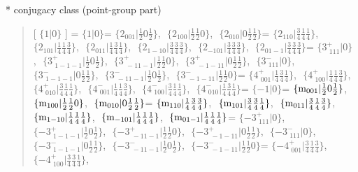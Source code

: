 \documentclass[fleqn,10pt,landscape]{jsarticle}
\begin{document}
* conjugacy class (point-group part)
\begin{quote}
[ $\{1|0\}$ ] = \quad $\{1|0\}$ = \quad $\{2{}_{001}|\frac{1}{2} 0 \frac{1}{2}\}$,\,\, $\{2{}_{100}|\frac{1}{2} \frac{1}{2} 0\}$,\,\, $\{2{}_{010}|0 \frac{1}{2} \frac{1}{2}\}$ = \quad $\{2{}_{110}|\frac{3}{4} \frac{1}{4} \frac{1}{4}\}$,\,\, $\{2{}_{101}|\frac{1}{4} \frac{1}{4} \frac{3}{4}\}$,\,\, $\{2{}_{011}|\frac{1}{4} \frac{3}{4} \frac{1}{4}\}$,\,\, $\{2{}_{1-10}|\frac{3}{4} \frac{3}{4} \frac{3}{4}\}$,\,\, $\{2{}_{-101}|\frac{3}{4} \frac{3}{4} \frac{3}{4}\}$,\,\, $\{2{}_{01-1}|\frac{3}{4} \frac{3}{4} \frac{3}{4}\}$\newline[ $\{3^{+}_{\,\,111}|0\}$ ] = \quad $\{3^{+}_{\,\,111}|0\}$,\,\, $\{3^{+}_{\,\,1-1-1}|\frac{1}{2} 0 \frac{1}{2}\}$,\,\, $\{3^{+}_{\,\,-11-1}|\frac{1}{2} \frac{1}{2} 0\}$,\,\, $\{3^{+}_{\,\,-1-11}|0 \frac{1}{2} \frac{1}{2}\}$,\,\, $\{3^{-}_{\,\,111}|0\}$,\,\, $\{3^{-}_{\,\,1-1-1}|0 \frac{1}{2} \frac{1}{2}\}$,\,\, $\{3^{-}_{\,\,-11-1}|\frac{1}{2} 0 \frac{1}{2}\}$,\,\, $\{3^{-}_{\,\,-1-11}|\frac{1}{2} \frac{1}{2} 0\}$ = \quad $\{4^{+}_{\,\,001}|\frac{1}{4} \frac{3}{4} \frac{1}{4}\}$,\,\, $\{4^{+}_{\,\,100}|\frac{1}{4} \frac{1}{4} \frac{3}{4}\}$,\,\, $\{4^{+}_{\,\,010}|\frac{3}{4} \frac{1}{4} \frac{1}{4}\}$,\,\, $\{4^{-}_{\,\,001}|\frac{1}{4} \frac{1}{4} \frac{3}{4}\}$,\,\, $\{4^{-}_{\,\,100}|\frac{3}{4} \frac{1}{4} \frac{1}{4}\}$,\,\, $\{4^{-}_{\,\,010}|\frac{1}{4} \frac{3}{4} \frac{1}{4}\}$\newline[ $\{-1|0\}$ ] = \quad $\{-1|0\}$ = \quad $\{{\rm m}_{001}|\frac{1}{2} 0 \frac{1}{2}\}$,\,\, $\{{\rm m}_{100}|\frac{1}{2} \frac{1}{2} 0\}$,\,\, $\{{\rm m}_{010}|0 \frac{1}{2} \frac{1}{2}\}$ = \quad $\{{\rm m}_{110}|\frac{1}{4} \frac{3}{4} \frac{3}{4}\}$,\,\, $\{{\rm m}_{101}|\frac{3}{4} \frac{3}{4} \frac{1}{4}\}$,\,\, $\{{\rm m}_{011}|\frac{3}{4} \frac{1}{4} \frac{3}{4}\}$,\,\, $\{{\rm m}_{1-10}|\frac{1}{4} \frac{1}{4} \frac{1}{4}\}$,\,\, $\{{\rm m}_{-101}|\frac{1}{4} \frac{1}{4} \frac{1}{4}\}$,\,\, $\{{\rm m}_{01-1}|\frac{1}{4} \frac{1}{4} \frac{1}{4}\}$\newline[ $\{-3^{+}_{\,\,111}|0\}$ ] = \quad $\{-3^{+}_{\,\,111}|0\}$,\,\, $\{-3^{+}_{\,\,1-1-1}|\frac{1}{2} 0 \frac{1}{2}\}$,\,\, $\{-3^{+}_{\,\,-11-1}|\frac{1}{2} \frac{1}{2} 0\}$,\,\, $\{-3^{+}_{\,\,-1-11}|0 \frac{1}{2} \frac{1}{2}\}$,\,\, $\{-3^{-}_{\,\,111}|0\}$,\,\, $\{-3^{-}_{\,\,1-1-1}|0 \frac{1}{2} \frac{1}{2}\}$,\,\, $\{-3^{-}_{\,\,-11-1}|\frac{1}{2} 0 \frac{1}{2}\}$,\,\, $\{-3^{-}_{\,\,-1-11}|\frac{1}{2} \frac{1}{2} 0\}$ = \quad $\{-4^{+}_{\,\,001}|\frac{3}{4} \frac{1}{4} \frac{3}{4}\}$,\,\, $\{-4^{+}_{\,\,100}|\frac{3}{4} \frac{3}{4} \frac{1}{4}\}$,\,\, 
\end{quote}
\end{document}
